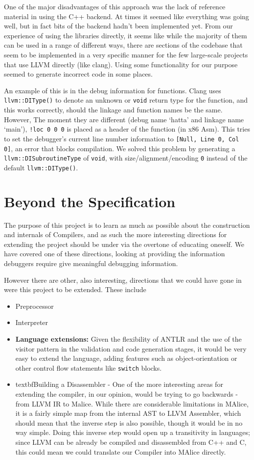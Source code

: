 \documentclass[a4wide, 11pt]{article}
\begin{document}
One of the major disadvantages of this approach was the lack of reference material in using the C++ backend. At times it seemed like everything was going well, but in fact bits of the backend hadn't been implemented yet. From our experience of using the libraries directly, it seems like while the majority of them can be used in a range of different ways, there are sections of the codebase that seem to be implemented in a very specific manner for the few large-scale projects that use LLVM directly (like clang). Using some functionality for our purpose seemed to generate incorrect code in some places.

An example of this is in the debug information for functions. Clang uses \texttt{llvm::DIType()} to denote an unknown or \texttt{void} return type for the function, and this works correctly, should the linkage and function names be the same. However, The moment they are different (debug name `hatta' and linkage name `main'), \texttt{!loc 0 0 0} is placed as a header of the function (in x86 Asm). This tries to set the debugger's current line number information to \texttt{[Null, Line 0, Col 0]}, an error that blocks compilation. We solved this problem by generating a \texttt{llvm::DISubroutineType} of \texttt{void}, with size/alignment/encoding \texttt{0} instead of the default \texttt{llvm::DIType()}. 

\section{Beyond the Specification}

The purpose of this project is to learn as much as possible about the construction and internals of Compilers, and as such the more interesting directions for extending the project should be under via the overtone of educating oneself. We have covered one of these directions, looking at providing the information debuggers require give meaningful debugging information. 

However there are other, also interesting, directions that we could have gone in were this project to be extended. These include
\begin{itemize}
\item Preprocessor
\item Interpreter
\item \textbf{Language extensions:} Given the flexibility of ANTLR and the use of the visitor pattern in the validation and code generation stages, it would be very easy to extend the language, adding features such as object-orientation or other control flow statements like \texttt{switch} blocks.
\item textbf{Building a Disassembler} - One of the more interesting areas for extending the compiler, in our opinion, would be trying to go backwards - from LLVM IR to Malice. While there are considerable limitations in MAlice, it is a fairly simple map from the internal AST to LLVM Assembler, which should mean that the inverse step is also possible, though it would be in no way simple. Doing this inverse step would open up a transitivity in languages; since LLVM can be already be compiled and disassembled from C++ and C, this could mean we could translate our Compiler into MAlice directly.
\end{itemize}
\end{document}
